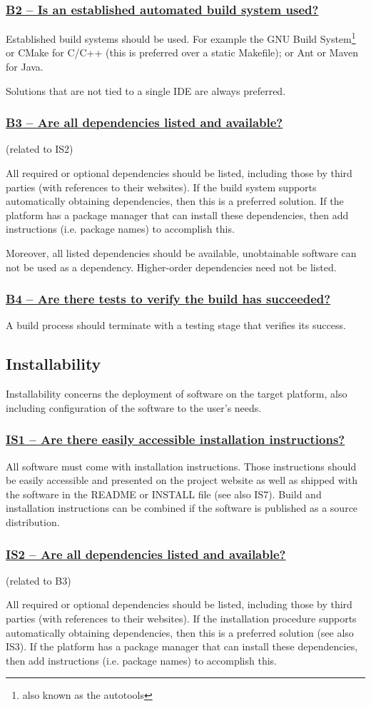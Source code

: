 \documentclass[a4paper,11pt]{article}
\newcommand{\indicator}[1]{\subsubsection*{\underline{#1}}}
\begin{document}
\indicator{B2 -- Is an established automated build system used?}

Established build systems should be used. For example the GNU Build
System\footnote{also known as the autotools} or CMake for C/C++ (this is
preferred over a static Makefile); or Ant or Maven for Java. 

Solutions that are not tied to a single IDE are always preferred.

\indicator{B3 -- Are all dependencies listed and available?}
(related to IS2)

All required or optional dependencies should be listed, including those by
third parties (with references to their websites). If the build system supports
automatically obtaining dependencies, then this is a preferred solution. If the
platform has a package manager that can install these dependencies, then add
instructions (i.e. package names) to accomplish this.

Moreover, all listed dependencies should be available, unobtainable software
can not be used as a dependency. Higher-order dependencies need not be listed.

\indicator{B4 -- Are there tests to verify the build has succeeded?}

A build process should terminate with a testing stage that verifies its success.

\subsection{Installability}

Installability concerns the deployment of software on the target platform, also
including configuration of the software to the user's needs.

\indicator{IS1 -- Are there easily accessible installation instructions?}

All software must come with installation instructions. Those instructions should
be easily accessible and presented on the project website as well as shipped
with the software in the README or INSTALL file (see also IS7). Build and installation
instructions can be combined if the software is published as a source
distribution.

\indicator{IS2 -- Are all dependencies listed and available?}
(related to B3)

All required or optional dependencies should be listed, including those by
third parties (with references to their websites). If the installation
procedure supports automatically obtaining dependencies, then this is a
preferred solution (see also IS3). If the platform has a package manager that
can install these dependencies, then add instructions (i.e. package names) to
accomplish this.
\end{document}
